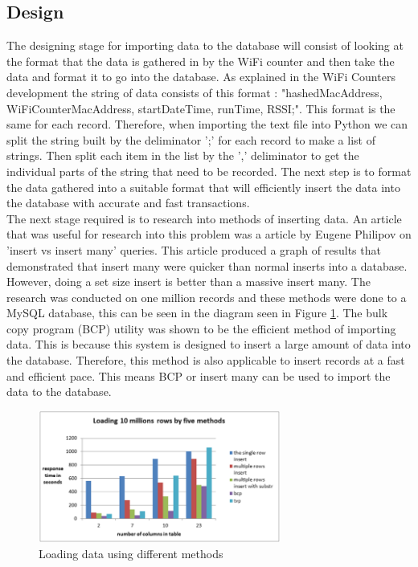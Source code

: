 \documentclass{report}
\begin{document}
\subsection{Design}
The designing stage for importing data to the database will consist of looking at the format that the data is gathered in by the WiFi counter and then take the data and format it to go into the database. As explained in the WiFi Counters development the  string of data consists of this format : "hashedMacAddress, WiFiCounterMacAddress, startDateTime, runTime, RSSI;". This format is the same for each record. Therefore, when importing the text file into Python we can split the string built by the deliminator ';' for each record to make a list of strings. Then split each item in the list by the ',' deliminator to get the individual parts of the string that need to be recorded. The next step is to format the data gathered into a suitable format that will efficiently insert the data into the database with accurate and fast transactions. \\ \newline
The next stage required is to research into methods of inserting data. An article that was useful for research into this problem was a article by Eugene Philipov on 'insert vs insert many' queries\cite{insertRecords}. This article produced a graph of results that demonstrated that insert many were quicker than normal inserts into a database. However, doing a set size insert is better than a massive insert many. The research was conducted on one million records and these methods were done to a MySQL database, this can be seen in the diagram seen in Figure \ref{fig:charRange_filterCheck}. The bulk copy program (BCP) utility\cite{BCP} was shown to be the efficient method of importing data. This is because this system is designed to insert a large amount of data into the database. Therefore, this method is also applicable to insert records at a fast and efficient pace. This means BCP or insert many can be used to import the data to the database. \\ \newline
\begin{figure}[h!]
    \centering
    \includegraphics[width=300]{loadingDataGraph.PNG}
    \caption{Loading data using different methods\cite{insertRecords}}
    \label{fig:charRange_filterCheck}
\end{figure} \\
\end{document}
